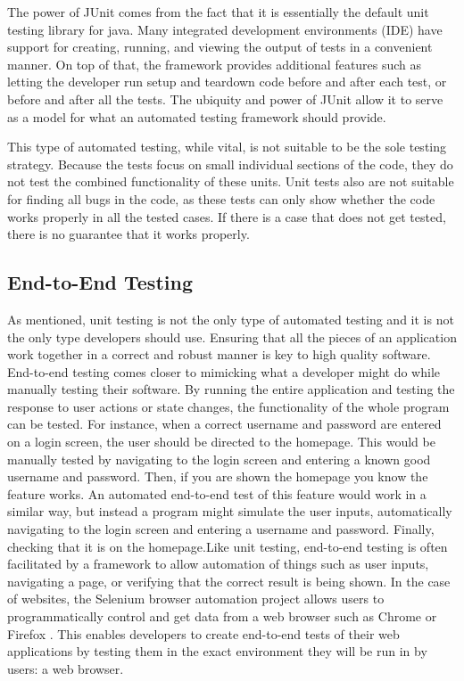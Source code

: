 \documentclass[12pt]{article}
\begin{document}
\begin{onehalfspacing}
The power of JUnit comes from the fact that it is essentially the
default unit testing library for java. Many integrated development
environments (IDE) have support for creating, running, and viewing the
output of tests in a convenient manner. On top of that, the framework
provides additional features such as letting the developer run setup and
teardown code before and after each test, or before and after all the
tests. The ubiquity and power of JUnit allow it to serve as a model for
what an automated testing framework should provide.

This type of automated testing, while vital, is not suitable to be the
sole testing strategy. Because the tests focus on small individual
sections of the code, they do not test the combined functionality of
these units. Unit tests also are not suitable for finding all bugs in
the code, as these tests can only show whether the code works properly
in all the tested cases. If there is a case that does not get tested,
there is no guarantee that it works properly.

\subsection{End-to-End Testing}

As mentioned, unit testing is not the only type of automated testing and
it is not the only type developers should use. Ensuring that all the
pieces of an application work together in a correct and robust manner is
key to high quality software. End-to-end testing comes closer to
mimicking what a developer might do while manually testing their
software. By running the entire application and testing the response to
user actions or state changes, the functionality of the whole program
can be tested. For instance, when a correct username and password are
entered on a login screen, the user should be directed to the homepage.
This would be manually tested by navigating to the login screen and
entering a known good username and password. Then, if you are shown the
homepage you know the feature works. An automated end-to-end test of
this feature would work in a similar way, but instead a program might
simulate the user inputs, automatically navigating to the login screen
and entering a username and password. Finally, checking that it is on
the homepage.Like unit testing, end-to-end testing is often facilitated
by a framework to allow automation of things such as user inputs,
navigating a page, or verifying that the correct result is being shown.
In the case of websites, the Selenium browser automation project allows
users to programmatically control and get data from a web browser such
as Chrome or Firefox \parencite{seleniumproject}. 
This enables developers
to create end-to-end tests of their web applications by testing them in
the exact environment they will be run in by users: a web browser.


\end{onehalfspacing}
\end{document}
